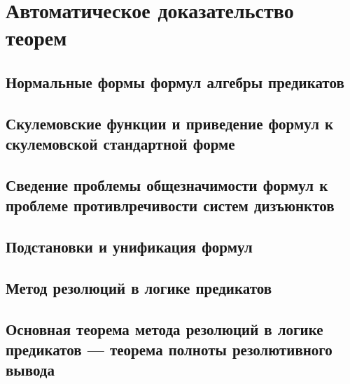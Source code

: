 \section{Автоматическое доказательство теорем}
\subsection{Нормальные формы формул алгебры предикатов}
\subsection{Скулемовские функции и приведение формул к скулемовской стандартной форме}
\subsection{Сведение проблемы общезначимости формул к проблеме противлречивости систем дизъюнктов}
\subsection{Подстановки и унификация формул}
\subsection{Метод резолюций в логике предикатов}
\subsection{Основная теорема метода резолюций в логике предикатов --- теорема полноты резолютивного вывода}